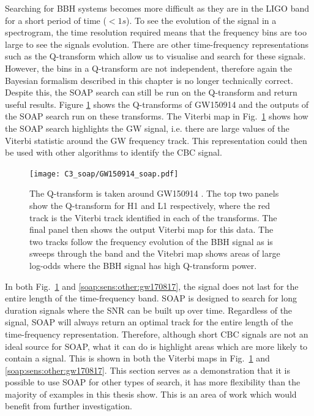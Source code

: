 Searching for \gls{BBH} systems becomes more difficult as they are in the \gls{LIGO} band for a short period of time ($ < 1 s$).
To see the evolution of the signal in a spectrogram, the time resolution required means that the frequency bins are too large to see the signals evolution.
There are other time-frequency representations such as the Q-transform which allow us to visualise and search for these signals. However, the bins in a Q-transform are not independent, therefore again the Bayesian formalism described in this chapter is no longer technically correct.
Despite this, the SOAP search can still be run on the Q-transform and return useful results. 
Figure \ref{soap:sens:other:gw150914} shows the Q-transforms of GW150914 \citep{abbott2016ObservationGravitational} and the outputs of the SOAP search run on these transforms.
The Viterbi map in Fig.~\ref{soap:sens:other:gw150914} shows how the SOAP search highlights the \gls{GW} signal, i.e. there are large values of the Viterbi statistic around the \gls{GW} frequency track. 
This representation could then be used with other algorithms to identify the \gls{CBC} signal.
%
\begin{figure}[ht]
	\centering
	\texttt{[image: C3\_soap/GW150914\_soap.pdf]}
        \caption[SOAP search run on GW150914]{The Q-transform is taken around GW150914 \citep{abbott2016ObservationGravitational}. The top two panels show the Q-transform for H1 and L1 respectively, where the red track is the Viterbi track identified in each of the transforms. The final panel then shows the output Viterbi map for this data. The two tracks follow the frequency evolution of the \gls{BBH} signal as is sweeps through the band and the Vitebri map shows areas of large log-odds where the \gls{BBH} signal has high Q-transform power.}
\label{soap:sens:other:gw150914}

\end{figure}
%

In both Fig.~\ref{soap:sens:other:gw150914} and \ref{soap:sens:other:gw170817}, the signal does not last for the entire length of the time-frequency band. 
SOAP is designed to search for long duration signals where the \gls{SNR} can be built up over time.
Regardless of the signal, SOAP will always return an optimal track for the entire length of the time-frequency representation. 
Therefore, although short \gls{CBC} signals are not an ideal source for SOAP, what it can do is highlight areas which are more likely to contain a signal. 
This is shown in both the Viterbi maps in Fig.~\ref{soap:sens:other:gw150914} and \ref{soap:sens:other:gw170817}.
This section serves as a demonstration that it is possible to use SOAP for other types of search, it has more flexibility than the majority of examples in this thesis show.
This is an area of work which would benefit from further
investigation.

